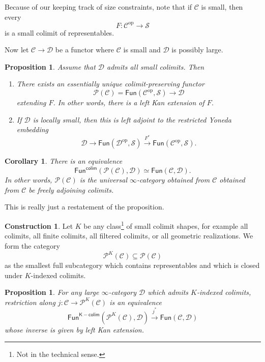 \documentclass[10pt, oneside]{memoir}
\newtheorem{cor}[thm]{Corollary}
\newtheorem{prop}[thm]{Proposition}
\theoremstyle{definition}
\newtheorem{con}[thm]{Construction}
\theoremstyle{remark}
\theoremstyle{plain}
\theoremstyle{definition}
\theoremstyle{remark}
\newcommand{\mc}[1]{\mathcal{#1}}
\newcommand{\ms}[1]{\mathsf{#1}}
\newcommand{\1}{\mathbf{1}}
\newcommand{\2}{\mathbf{2}}
\newcommand{\3}{\mathbf{3}}
\DeclareMathOperator{\op}{op}
\begin{document}
Because of our keeping track of size constraints, note that if \(\mc{C} \) is small, then every
\[ F \colon \mc{C}^{\op} \to \mc{S} \]
is a small colimit of representables.

Now let \(\mc{C} \to \mc{D} \) be a functor where \(\mc{C} \) is small and \(\mc{D} \) is possibly large.

\begin{prop}
    Assume that \(\mc{D} \) admits all small colimits. Then
    \begin{enumerate}
        \item There exists an essentially unique colimit-preserving functor
        \[ \mc{P}(\mc{C}) = \ms{Fun}(\mc{C}^{\op}, \mc{S}) \to \mc{D} \]
        extending \(F \). In other words, there is a left Kan extension of \(F \).
        \item If \(\mc{D} \) is locally small, then this is left adjoint to the restricted Yoneda embedding
        \[ \mc{D} \to \ms{Fun}(\mc{D}^{\op}, \mc{S}) \xrightarrow{F^*} \ms{Fun}(\mc{C}^{\op}, \mc{S}). \]
    \end{enumerate}
\end{prop}

\begin{cor}
    There is an equivalence
    \[ \ms{Fun}^{\ms{colim}}(\mc{P}(\mc{C}), \mc{D}) \simeq \ms{Fun}(\mc{C}, \mc{D}). \]
    In other words, \(\mc{P}(\mc{C}) \) is the universal \(\infty \)-category obtained from \(\mc{C} \) obtained from \(\mc{C} \) be freely adjoining colimits.
\end{cor}
This is really just a restatement of the proposition.

\begin{con}
    Let \(K \) be any class\footnote{Not in the technical sense.} of small colimit shapes, for example all colimits, all finite colimits, all filtered colimits, or all geometric realizations. We form the category
    \[ \mc{P}^K(\mc{C}) \subseteq \mc{P}(\mc{C}) \]
    as the smallest full subcategory which contains representables and which is closed under \(K \)-indexed colimits.
\end{con}

\begin{prop}
    For any large \(\infty \)-category \(\mc{D} \) which admits \(K \)-indexed colimits, restriction along \(j \colon \mc{C} \to \mc{P}^K(\mc{C}) \) is an equivalence
    \[ \ms{Fun}^{\ms{K-colim}} (\mc{P}^K(\mc{C}), \mc{D}) \xrightarrow{j^*} \ms{Fun}(\mc{C}, \mc{D}) \]
    whose inverse is given by left Kan extension.
\end{prop}
\end{document}
